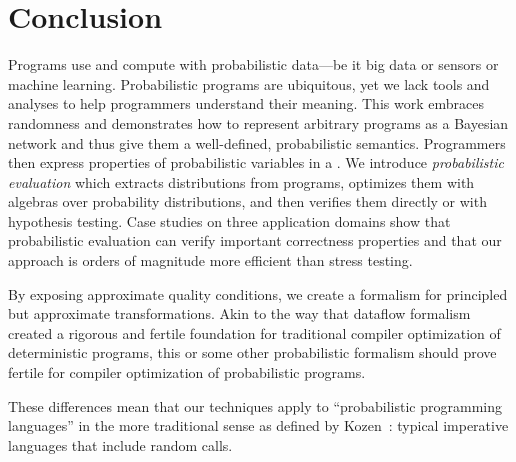 
\section{Conclusion}
Programs use and compute with probabilistic data---be it big data or
sensors or machine learning.  Probabilistic programs are ubiquitous,
yet we lack tools and analyses to help programmers understand their
meaning. This work embraces randomness and demonstrates how to
represent arbitrary programs as a Bayesian network and thus give them
a well-defined, probabilistic semantics.  Programmers then express
properties of probabilistic variables in a \passert.  We introduce
\emph{probabilistic evaluation} which extracts distributions from
programs, optimizes them with algebras over probability distributions,
and then verifies them directly or with hypothesis testing.  Case
studies on three application domains show that probabilistic evaluation
can verify important correctness properties
and that our approach is orders of
magnitude more efficient than stress testing.


By exposing approximate quality conditions, we create a
formalism for principled but approximate transformations.  Akin to the
way that dataflow formalism created a rigorous and fertile foundation
for traditional compiler optimization of deterministic programs, this
or some other probabilistic formalism should prove fertile for compiler optimization
of probabilistic programs.

These differences mean that our techniques
apply to ``probabilistic programming languages'' in the more traditional sense as defined
by Kozen~\cite{kozen}: typical imperative languages that include random calls.

